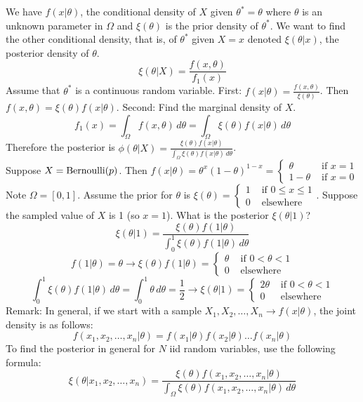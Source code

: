 \documentclass[12pt]{article}
\begin{document}
We have $f(x|\theta)$, the conditional density of $X$ given $\theta^* = \theta$ where $\theta$ is an unknown parameter in $\Omega$ and $\xi(\theta)$ is the prior density of $\theta^*$. We want to find the other conditional density, that is, of $\theta^*$ given $X = x$ denoted $\xi(\theta|x)$, the posterior density of $\theta$. 
$$ \xi(\theta|X) = \frac{f(x,\theta)}{f_1(x)} $$ 
Assume that $\theta^*$ is a continuous random variable. First: $f(x|\theta) = \frac{f(x,\theta)}{\xi(\theta)}$. Then $f(x,\theta) = \xi(\theta)f(x|\theta)$. Second: Find the marginal density of $X$. $$ f_1(x) = \int_{\Omega} f(x,\theta) \, d\theta = \int_\Omega \xi(\theta)f(x|\theta) \, d\theta $$ 
Therefore the posterior is $\phi(\theta|X) = \frac{\xi(\theta)f(x|\theta)}{\int_\Omega \xi(\theta) f(x|\theta) \, d\theta} $. \\
Suppose $X = \mathrm{Bernoulli}( p )$. 
Then $f(x|\theta) = \theta^x(1-\theta)^{1-x} = \begin{cases} \theta &\text{ if } x = 1 \\ 1 - \theta &\text{ if } x = 0 \end{cases} $ Note $\Omega = [0,1]$. Assume the prior for $\theta$ is $\xi(\theta) = \begin{cases} 1 &\text{ if } 0 \leq x \leq 1 \\ 0 &\text{ elsewhere} \end{cases} $. Suppose the sampled value of $X$ is 1 (so $x = 1$). What is the posterior $\xi(\theta|1)$? $$ \xi(\theta|1) = \frac{\xi(\theta)f(1|\theta)}{\int_0^1 \xi(\theta)f(1|\theta) \, d\theta} $$ 
$$ f(1|\theta) = \theta \to \xi(\theta)f(1|\theta) = \begin{cases} \theta &\text{ if } 0 < \theta < 1 \\ 0 &\text{ elsewhere} \end{cases} $$ $$ \int_0^1 \xi(\theta) f(1|\theta) \, d\theta = \int_0^1 \theta \, d\theta = \frac{1}{2} \to \xi(\theta|1) = \begin{cases} 2\theta &\text{ if } 0 < \theta < 1 \\ 0 &\text{ elsewhere} \end{cases} $$ 
Remark: In general, if we start with a sample $X_1,X_2,\dots, X_n \to f(x|\theta)$, the joint density is as follows: $$ f(x_1,x_2,\dots, x_n|\theta) = f(x_1|\theta)f(x_2|\theta)\dots f(x_n|\theta)$$ 
To find the posterior in general for $N$ iid random variables, use the following formula: 
$$ \xi(\theta|x_1,x_2,\dots, x_n) = \frac{\xi(\theta)f(x_1,x_2,\dots,x_n|\theta)}{\int_{\Omega} \xi(\theta)f(x_1,x_2,\dots,x_n|\theta) \, d\theta} $$ 
\end{document}
